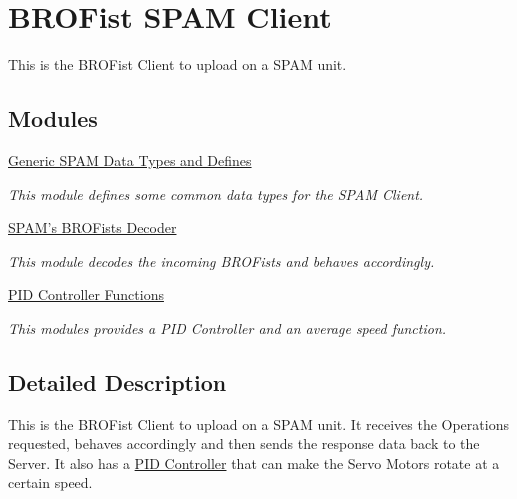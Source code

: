 \hypertarget{group___b_r_o_spam}{
\section{BROFist SPAM Client}
\label{group___b_r_o_spam}
}


This is the BROFist Client to upload on a SPAM unit.  


\subsection*{Modules}
\begin{DoxyCompactItemize}
\item 
\hyperlink{group___b_r_o_s_client}{Generic SPAM Data Types and Defines}


\begin{DoxyCompactList}\small\item\em This module defines some common data types for the SPAM Client. \item\end{DoxyCompactList}

\item 
\hyperlink{group___b_r_o_s_fists}{SPAM's BROFists Decoder}


\begin{DoxyCompactList}\small\item\em This module decodes the incoming BROFists and behaves accordingly. \item\end{DoxyCompactList}

\item 
\hyperlink{group___b_r_o_s_pid}{PID Controller Functions}


\begin{DoxyCompactList}\small\item\em This modules provides a PID Controller and an average speed function. \item\end{DoxyCompactList}

\end{DoxyCompactItemize}


\subsection{Detailed Description}
This is the BROFist Client to upload on a SPAM unit. It receives the Operations requested, behaves accordingly and then sends the response data back to the Server. It also has a \hyperlink{group___b_r_o_s_pid_PIDController}{PID Controller} that can make the Servo Motors rotate at a certain speed. 